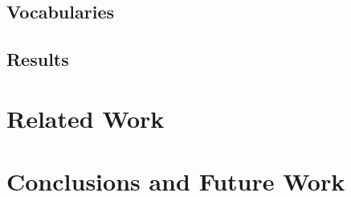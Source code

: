 \documentclass{llncs}
\begin{document}
\subsection{Vocabularies}

\subsection{Results}

\section{Related Work}

\section{Conclusions and Future Work}



\end{document}
